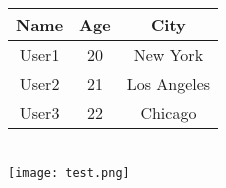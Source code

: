 \documentclass{article}
\begin{document}
\begin{tabular}{|c|c|c|}
\hline
Name & Age & City \\
\hline
User1 & 20 & New York \\
\hline
User2 & 21 & Los Angeles \\
\hline
User3 & 22 & Chicago \\
\hline
\end{tabular} \\
\texttt{[image: test.png]}
\end{document}
